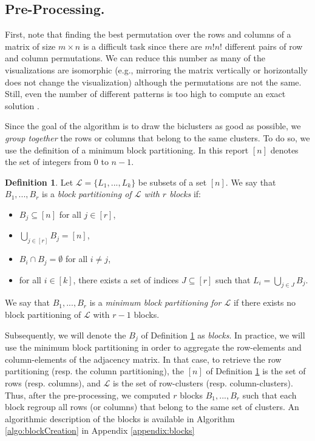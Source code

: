 \documentclass[twoside,leqno,twocolumn]{article}
\theoremstyle{definition}
\newtheorem{definition}{Definition}[section]
\begin{document}
\subsection{Pre-Processing.}
\noindent First, note that finding the best permutation over the rows and columns of a matrix of size $m\times n$ is a difficult task since there are $m!n!$ different pairs of row and column permutations. We can reduce this number as many of the visualizations are isomorphic (e.g., mirroring the
matrix vertically or horizontally does not change the visualization) although the
permutations are not the same. Still, even the number of different patterns is too high to compute an exact solution \cite{nphard}.


\medskip

\noindent Since the goal of the algorithm is to draw the biclusters as good as possible, we \emph{group together} the rows or columns that belong to the same clusters. To do so, we use the definition of a minimum block partitioning. In this report $[n]$ denotes the set of integers from $0$ to $n-1$.

\medskip
\begin{definition}
\label{def:blocks}
Let $\mathcal{L} = \{L_1,...,L_k\}$ be subsets of a set $[n]$. We say that $B_1,...,B_r$ is a \emph{block partitioning of $\mathcal{L}$ with $r$ blocks} if:
\begin{itemize}
\item  $B_j \subseteq [n]$ for all $j \in [r]$,
\item $\bigcup_{j \in [r]} B_j = [n]$,
\item $B_i \cap B_j = \emptyset$ for all $i \neq j$,
\item for all $i \in [k]$, there exists a set of indices $J \subseteq [r]$ such that $L_i = \bigcup_{j \in J} B_j$.
\end{itemize}

 We say that $B_1,...,B_r$ is a \emph{minimum block partitioning for $\mathcal{L}$} if there exists no block partitioning of $\mathcal{L}$ with $r-1$ blocks.
\end{definition}

\noindent Subsequently, we will denote the $B_j$ of Definition \ref{def:blocks} as \emph{blocks}. In practice, we will use the minimum block partitioning in order to aggregate the row-elements and column-elements of the adjacency matrix. In that case, to retrieve the row partitioning (resp. the column partitioning), the $[n]$ of Definition \ref{def:blocks} is the set of rows (resp. columns), and $\mathcal{L}$ is the set of row-clusters (resp. column-clusters). Thus, after the pre-processing, we computed $r$ blocks $B_1,...,B_r$ such that each block regroup all rows (or columns) that belong to the same set of clusters. An algorithmic description of the blocks is available in Algorithm \ref{algo:blockCreation} in  Appendix \ref{appendix:blocks}
\end{document}
